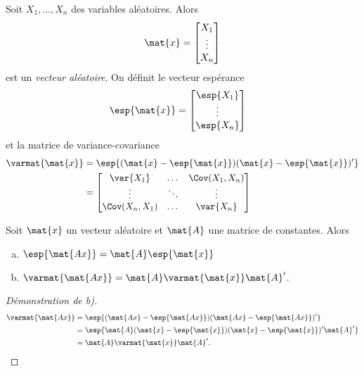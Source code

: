 Soit $X_1, \dots, X_n$ des variables aléatoires. Alors
\begin{displaymath}
  \mat{x} =
  \begin{bmatrix}
    X_1 \\
    \vdots \\
    X_n
  \end{bmatrix}
\end{displaymath}
est un \emph{vecteur aléatoire}. On définit le vecteur espérance
\begin{align*}
  \esp{\mat{x}}
  &=
  \begin{bmatrix}
    \esp{X_1} \\
    \vdots \\
    \esp{X_n}
  \end{bmatrix}
\end{align*}
et la matrice de variance-covariance
\begin{align*}
  \varmat{\mat{x}}
  &= \esp{(\mat{x} - \esp{\mat{x}})(\mat{x} - \esp{\mat{x}})^\prime } \\
  &=
  \begin{bmatrix}
    \var{X_1} & \dots & \Cov(X_1, X_n) \\
    \vdots    & \ddots & \vdots \\
    \Cov(X_n, X_1) & \dots & \var{X_n}
  \end{bmatrix}
\end{align*}

\begin{thm}
  \label{thm:elements:esp_var}
  Soit $\mat{x}$ un vecteur aléatoire et $\mat{A}$ une matrice de
  constantes. Alors
  \begin{enumerate}[a)]
  \item $\esp{\mat{Ax}} = \mat{A} \esp{\mat{x}}$
    \label{thm:elements:esp_var:esp}
  \item $\varmat{\mat{Ax}} = \mat{A} \varmat{\mat{x}} \mat{A}^\prime $.
    \label{thm:elements:esp_var:var}
  \end{enumerate}
\end{thm}

\begin{proof}[Démonstration de b)]
  \begin{align*}
    \varmat{\mat{Ax}}
    &= \esp{(\mat{Ax} - \esp{\mat{Ax}})(\mat{Ax} - \esp{\mat{Ax}})^\prime } \\
    &= \esp{\mat{A}(\mat{x} - \esp{\mat{x}})(\mat{x} - \esp{\mat{x}})^\prime
       \mat{A}^\prime } \\
    &= \mat{A} \varmat{\mat{x}} \mat{A}^\prime .
  \end{align*}
\end{proof}

